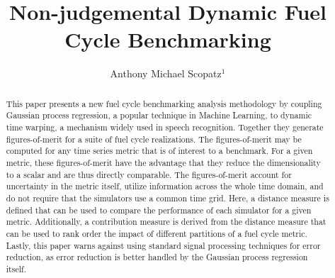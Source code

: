 \documentclass{ntmanuscript}
\title{Non-judgemental Dynamic Fuel Cycle Benchmarking}
\author{Anthony Michael Scopatz$^1$}
\institute{$^1$University of South Carolina, Department of Mechanical
    Engineering, Nuclear Engineering Program, Columbia, SC 29201}
\date{}
\begin{document}
\begin{abstract}
This paper presents a new fuel cycle benchmarking analysis methodology
by coupling Gaussian process regression, a popular technique in Machine
Learning, to dynamic time warping, a mechanism widely used in speech
recognition. Together they generate figures-of-merit for a suite of fuel
cycle realizations. The figures-of-merit may be computed for any time
series metric that is of interest to a benchmark. For a given metric,
these figures-of-merit have the advantage that they reduce the
dimensionality to a scalar and are thus directly comparable.
The figures-of-merit
account for uncertainty in the metric itself, utilize information
across the whole time domain, and do not require that the simulators
use a common time grid. Here, a distance measure is defined that can be used
to compare the performance of each simulator for a given metric. Additionally,
a contribution measure is derived from the distance measure that can be used
to rank order the impact of different partitions of a fuel cycle metric.
Lastly, this paper
warns against using standard signal processing techniques for error reduction,
as error reduction is better handled by the Gaussian process regression
itself.
\end{abstract}












\end{document}
